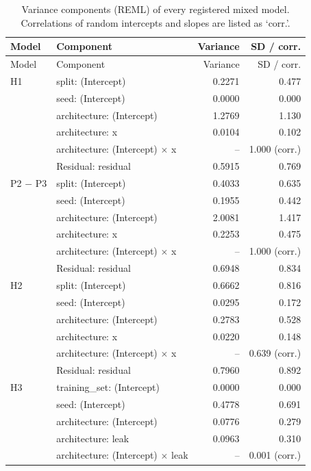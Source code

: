 {\scriptsize
\setlength{\tabcolsep}{3.5pt}
\begin{longtable}{llrr}
\caption{Variance components (REML) of every registered mixed model. Correlations of random intercepts and slopes are listed as `corr.'.}\label{r:tab:varcomp}\\
\toprule
Model & Component & Variance & SD / corr. \\
\midrule
\endfirsthead
\toprule
Model & Component & Variance & SD / corr. \\
\midrule
\endhead
\bottomrule
\endfoot
H1 & split: (Intercept) & 0.2271 & 0.477 \\
 & seed: (Intercept) & 0.0000 & 0.000 \\
 & architecture: (Intercept) & 1.2769 & 1.130 \\
 & architecture: x & 0.0104 & 0.102 \\
 & architecture: (Intercept) $\times$ x & -- & \textminus{}1.000 (corr.) \\
 & Residual: residual & 0.5915 & 0.769 \\
P2 $-$ P3 & split: (Intercept) & 0.4033 & 0.635 \\
 & seed: (Intercept) & 0.1955 & 0.442 \\
 & architecture: (Intercept) & 2.0081 & 1.417 \\
 & architecture: x & 0.2253 & 0.475 \\
 & architecture: (Intercept) $\times$ x & -- & \textminus{}1.000 (corr.) \\
 & Residual: residual & 0.6948 & 0.834 \\
H2 & split: (Intercept) & 0.6662 & 0.816 \\
 & seed: (Intercept) & 0.0295 & 0.172 \\
 & architecture: (Intercept) & 0.2783 & 0.528 \\
 & architecture: x & 0.0220 & 0.148 \\
 & architecture: (Intercept) $\times$ x & -- & \textminus{}0.639 (corr.) \\
 & Residual: residual & 0.7960 & 0.892 \\
H3 & training\_set: (Intercept) & 0.0000 & 0.000 \\
 & seed: (Intercept) & 0.4778 & 0.691 \\
 & architecture: (Intercept) & 0.0776 & 0.279 \\
 & architecture: leak & 0.0963 & 0.310 \\
 & architecture: (Intercept) $\times$ leak & -- & 0.001 (corr.) \\

\end{longtable}}
